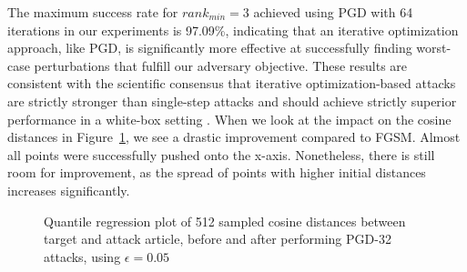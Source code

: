 The maximum success rate for $rank_{min}=3$ achieved using \ac{PGD} with 64 iterations in our experiments is 97.09\%, indicating that an iterative optimization approach, like \ac{PGD}, is significantly more effective at successfully finding worst-case perturbations that fulfill our adversary objective. These results are consistent with the scientific consensus that iterative optimization-based attacks are strictly stronger than single-step attacks and should achieve strictly superior performance in a white-box setting \parencite{athalye2018obfuscated}. When we look at the impact on the cosine distances in Figure~\ref{fig:pgd-quantile}, we see a drastic improvement compared to \ac{FGSM}. Almost all points were successfully pushed onto the x-axis. Nonetheless, there is still room for improvement, as the spread of points with higher initial distances increases significantly.
\begin{figure}[H]
	\centering
	
	\caption{Quantile regression plot of 512 sampled cosine distances between target and attack article, before and after performing \acs{PGD}-32 attacks, using $\epsilon=0.05$}
	\label{fig:pgd-quantile}
\end{figure}

